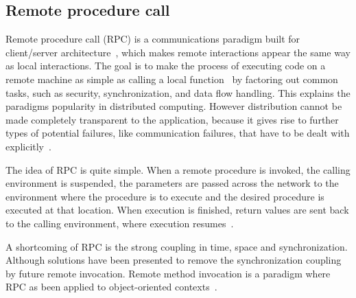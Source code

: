 


\subsection{Remote procedure call}
\label{sec:analysis:rpc}
Remote procedure call (RPC) is a communications paradigm built for client/server architecture~\cite{Microsoft2003RPC}, which makes remote interactions appear the same way as local interactions. The goal is to make the process of executing code on a remote machine as simple as calling a local function~\cite{dusseau2014intro} by factoring out common tasks, such as security, synchronization, and data flow handling. This explains the paradigms popularity in distributed computing. However distribution cannot be made completely transparent to the application, because it gives rise to further types of potential failures, like communication failures, that have to be dealt with explicitly~\cite{coulouris2005distributed}. 

The idea of RPC is quite simple. When a remote procedure is invoked, the calling environment is suspended, the parameters are passed across the network to the environment where the procedure is to execute and the desired procedure is executed at that location. When execution is finished, return values are sent back to the calling environment, where execution resumes~\cite{birrell1984implementing}.

A shortcoming of RPC is the strong coupling in time, space and synchronization. Although solutions have been presented to remove the synchronization coupling by future remote invocation. Remote method invocation is a paradigm where RPC as been applied to object-oriented contexts~\cite{eugster2003many}.





